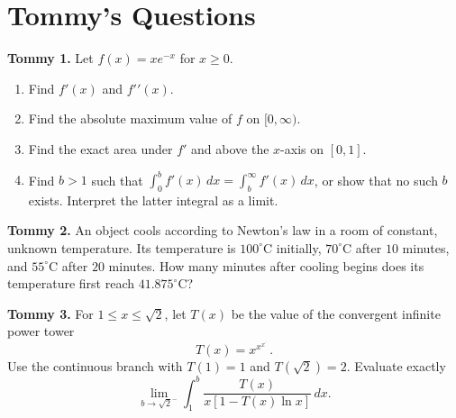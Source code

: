\documentclass[11pt]{article}
\newcommand{\wsL}{\vspace*{6.5cm}}
\newcommand{\prob}[1]{\par\noindent\textbf{#1.}\quad}
\begin{document}
\section*{Tommy's Questions}
\prob{Tommy 1} Let $f(x)=xe^{-x}$ for $x\geq0$.
\begin{enumerate}[label=(\alph*)]
\item Find $f\prime(x)$ and $f\prime\prime(x)$.
\item Find the absolute maximum value of $f$ on $[0,\infty)$.
\item Find the exact area under $f\prime$ and above the $x$-axis on $[0,1]$.
\item Find $b>1$ such that $\int_0^b f\prime(x)\,dx=\int_b^\infty f\prime(x)\,dx$, or show that no such $b$ exists. Interpret the latter integral as a limit.
\end{enumerate}
\wsL\clearpage
\prob{Tommy 2} An object cools according to Newton's law in a room of constant, unknown temperature. Its temperature is $100^\circ$C initially, $70^\circ$C after $10$ minutes, and $55^\circ$C after $20$ minutes. How many minutes after cooling begins does its temperature first reach $41.875^\circ$C?
\wsL\clearpage
\prob{Tommy 3} For $1\leq x\leq\sqrt2$, let $T(x)$ be the value of the convergent infinite power tower
\[T(x)=x^{x^{x^{\cdot^{\cdot^{\cdot}}}}}.
\]
Use the continuous branch with $T(1)=1$ and $T(\sqrt2)=2$. Evaluate exactly
\[\lim_{b\to\sqrt2^-}\int_1^b \frac{T(x)}{x[1-T(x)\ln x]}\,dx.\]
\wsL\clearpage
\end{document}
